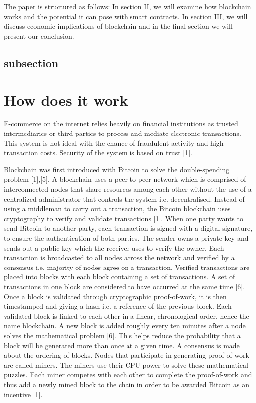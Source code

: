 \documentclass[report]{IEEEtran}
\begin{document}
\\\\ The paper is structured as follows: In section II, we will examine how blockchain works and the potential it can pose with smart contracts. In section III, we will discuss economic implications of blockchain and in the final section we will present our conclusion.

\subsection{subsection}

\section{How does it work}
E-commerce on the internet relies heavily on financial institutions as trusted intermediaries or third parties to process and mediate electronic transactions. This system is not ideal with the chance of fraudulent activity and high transaction costs. Security of the system is based on trust [1]. 

Blockchain was first introduced with Bitcoin to solve the double-spending problem [1],[5]. A blockchain uses a peer-to-peer network which is comprised of interconnected nodes that share resources among each other without the use of a centralized administrator that controls the system i.e. decentralised. Instead of using a middleman to carry out a transaction, the Bitcoin blockchain uses cryptography to verify and validate transactions [1]. When one party wants to send Bitcoin to another party, each transaction is signed with a digital signature, to ensure the authentication of both parties. The sender owns a private key and sends out a public key which the receiver uses to verify the owner. Each transaction is broadcasted to all nodes across the network and verified by a consensus i.e. majority of nodes agree on a transaction. Verified transactions are placed into blocks with each block containing a set of transactions. A set of transactions in one block are considered to have occurred at the same time [6]. Once a block is validated through cryptographic proof-of-work, it is then timestamped and giving a hash i.e. a reference of the previous block. Each validated block is linked to each other in a linear, chronological order, hence the name blockchain. A new block is added roughly every ten minutes after a node solves the mathematical problem [6]. This helps reduce the probability that a block will be generated more than once at a given time. A consensus is made about the ordering of blocks. Nodes that participate in generating proof-of-work are called miners. The miners use their CPU power to solve these mathematical puzzles. Each miner competes with each other to complete the proof-of-work and thus add a newly mined block to the chain in order to be awarded Bitcoin as an incentive [1].  
\end{document}
